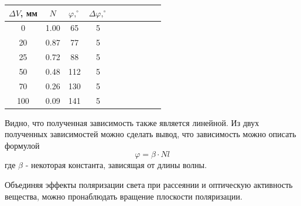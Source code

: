 \documentclass[14pt]{article}
\begin{document}
\begin{center}
\begin{tabular}{|c|c|c|c|c|c|c|c|c|c|}
\hline
$\Delta V$, мм	&	$N$		&	$\varphi, ^\circ$	&	$\Delta\varphi, ^\circ$		\\
\hline
0				&	1.00	&	65					&	5							\\
\hline
20				&	0.87	&	77					&	5							\\
\hline
25				&	0.72	&	88					&	5							\\
\hline
50				&	0.48	&	112					&	5							\\
\hline
70				&	0.26	&	130					&	5							\\
\hline
100				&	0.09	&	141					&	5							\\
\hline
\end{tabular}
\end{center}

\begin{flushleft}
\end{flushleft}

Видно, что полученная зависимость также является линейной. Из двух полученных зависимостей можно сделать вывод, что зависимость можно описать формулой
$$	
	\varphi = \beta\cdot Nl
$$
где $\beta$ - некоторая константа, зависящая от длины волны. 

\newpage
Объединяя эффекты поляризации света при рассеянии и оптическую активность вещества, можно пронаблюдать вращение плоскости поляризации.
\end{document}
